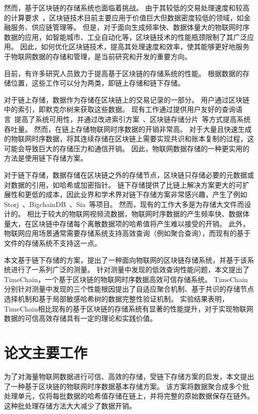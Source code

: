 然而，基于区块链的存储系统也面临着挑战。
由于其较低的交易处理速度和较高的计算要求~\cite{dorri2017towards}，区块链技术目前主要应用于价值巨大但数据密度较低的领域，如金融服务、供应链管理等。
但是，对于面向生成频率快、数据体量大的物联网时序数据的应用，如智能城市、工业自动化等，区块链技术的性能瓶颈限制了其广泛应用。
因此，如何优化区块链技术，提高其处理速度和效率，使其能够更好地服务于物联网数据的存储和管理，是当前研究和开发的重要方向。

目前，有许多研究人员致力于提高基于区块链的存储系统的性能。
根据数据的存储位置，这些工作可以分为两类，即链上存储和链下存储。

对于链上存储，数据作为存储在区块链上的交易记录的一部分。
用户通过区块链中的索引，即默克尔树来获取这些数据。
现有工作通过提供用户友好的查询语言~\cite{zhu2019sebdb,xu2019vchain,wang2022vchain+}提高了系统可用性，并通过改进索引方案~\cite{li2023lvmt,zhang2024cole}、区块链存储分片~\cite{zamani2018rapidchain,hong2023gridb,el2019blockchaindb}等方式提高系统吞吐量。
然而，在链上存储物联网时序数据的开销非常高。
对于大量且快速生成的物联网时序数据，将其连续存储在区块链上需要实现共识和账本复制的过程，这可能会导致巨大的存储压力和通信开销。
因此，物联网数据存储的一种更实用的方法是使用链下存储方案。

对于链下存储，数据存储在区块链之外的存储节点，区块链只存储必要的元数据或对数据的引用，如哈希或加密指针。
链下存储提供了比链上解决方案更大的可扩展性和更低的成本，因此业界和学术界对链下存储方案非常感兴趣，产生了例如Storj~\cite{storj2018storj}、BigchainDB~\cite{mcconaghy2016bigchaindb}、Sia~\cite{sia}等项目。
然而，现有的工作大多是为存储大文件而设计的。
相比于较大的物联网视频流数据，物联网时序数据的产生频率快、数据体量大，在区块链中存储每个离散数据项的哈希值将产生难以接受的开销。
此外，物联网应用场景通常需要存储系统支持高效查询（例如聚合查询），而现有的基于文件的存储系统不支持这一点。

本文基于链下存储的方案，提出了一种面向物联网的区块链存储系统，并基于该系统进行了一系列广泛的测量。
针对测量中发现的低效查询性能问题，本文提出了TimeChain，一个基于区块链的物联网时序数据高效可信存储系统。
TimeChain分别针对测量中发现的三个性能根因提出了自适应聚合机制、基于共识的存储节点选择机制和基于局部敏感哈希树的数据完整性验证机制。
实验结果表明，TimeChain相比现有的基于区块链的存储系统有显著的性能提升，对于实现物联网数据的可信高效存储具有一定的理论和实践价值。

\section{论文主要工作}
为了对海量物联网数据进行可信、高效的存储，受链下存储方案的启发，本文提出了一种基于区块链的物联网时序数据基本存储方案。
该方案将数据聚合成多个批处理单元，仅将每批数据的哈希值存储在链上，并将完整的原始数据保存在链外。
这种批处理存储方法大大减少了数据开销。

